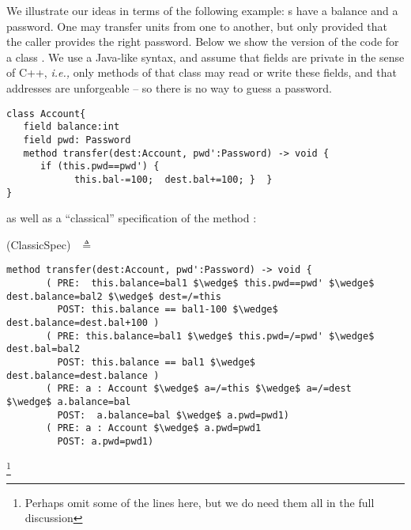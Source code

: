  
 
 We illustrate our ideas in terms of the following example:
 s have a balance and a 
password. One may transfer  units from one  to another, but only provided
that  the caller provides the right password. Below we show the version  of the code for 
a class . 
We use a Java-like syntax,  and assume that fields are private in the sense of C++, \emph{i.e.,}
 only methods of that class may read or write these fields,
 and   that addresses are unforgeable -- so  there is no way to guess a password.

 

\begin{lstlisting}
class Account{
   field balance:int 
   field pwd: Password 
   method transfer(dest:Account, pwd':Password) -> void {
      if (this.pwd==pwd') {
            this.bal-=100;  dest.bal+=100; }  }
}
\end{lstlisting}

as well as a ``classical'' specification of the method :

 (ClassicSpec)$  \ \ $  $\triangleq$

\begin{lstlisting}[mathescape=true, frame=lines]
  method transfer(dest:Account, pwd':Password) -> void {
       ( PRE:  this.balance=bal1 $\wedge$ this.pwd==pwd' $\wedge$ dest.balance=bal2 $\wedge$ dest=/=this 
         POST: this.balance == bal1-100 $\wedge$  dest.balance=dest.bal+100 )
       ( PRE: this.balance=bal1 $\wedge$ this.pwd=/=pwd' $\wedge$ dest.bal=bal2
         POST: this.balance == bal1 $\wedge$  dest.balance=dest.balance )
       ( PRE: a : Account $\wedge$ a=/=this $\wedge$ a=/=dest  $\wedge$ a.balance=bal  
         POST:  a.balance=bal $\wedge$ a.pwd=pwd1)
       ( PRE: a : Account $\wedge$ a.pwd=pwd1  
         POST: a.pwd=pwd1)       
\end{lstlisting}\footnote{Perhaps omit some of the lines here, but we do need them all in the full discussion}
 
